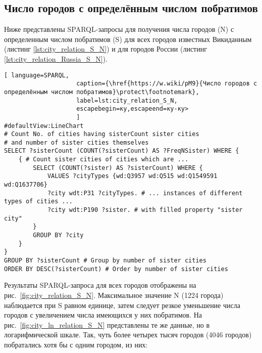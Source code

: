 \subsection{Число городов с определённым числом побратимов}

Ниже представлены SPARQL-запросы для получения числа городов (N) с определенным числом побратимов (S) для всех городов известных Викиданным (листинг \ref{lst:city_relation_S_N}) и для городов России (листинг \ref{lst:city_relation_Russia_S_N}).

\begin{lstlisting}[ language=SPARQL, 
                    caption={\href{https://w.wiki/pM9}{Число городов с определённым числом побратимов}\protect\footnotemark},
                    label=lst:city_relation_S_N, 
                    escapebegin=ку,escapeend=ку-ку>
                    ]
#defaultView:LineChart
# Count No. of cities having sisterCount sister cities 
# and number of sister cities themselves
SELECT ?sisterCount (COUNT(?sisterCount) AS ?FreqNSister) WHERE {                                                                         
	{ # Count sister cities of cities which are ...
		SELECT (COUNT(?sister) AS ?sisterCount) WHERE {        
			VALUES ?cityTypes {wd:Q3957 wd:Q515 wd:Q1549591 wd:Q1637706}
			?city wdt:P31 ?cityTypes. # ... instances of different types of cities ...
			?city wdt:P190 ?sister. # with filled property "sister city"
		}
		GROUP BY ?city
	}
}
GROUP BY ?sisterCount # Group by number of sister cities                                     
ORDER BY DESC(?sisterCount) # Order by number of sister cities   
\end{lstlisting}

Результаты SPARQL-запроса для всех городов отображены на рис.~\ref{fig:city_relation_S_N}. Максимальное значение N (\num{1224} города) наблюдается при S равном единице, затем следует резкое уменьшение числа городов с увеличением числа имеющихся у них побратимов. На рис.~\ref{fig:city_ln_relation_S_N} представлены те же данные, но в логарифмической шкале. Так, чуть более четырех тысяч городов (\num{4046} городов) побратались хотя бы с одним городом, из них:

